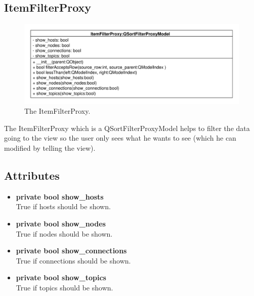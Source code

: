 \subsection{ItemFilterProxy}
\begin{figure}[htbp]
	\begin{minipage}[t]{7cm}
		\vspace{0pt}
		\centering
		\includegraphics[scale=0.6]{./diagram_pictures/ItemFilter.pdf}
		\caption{The ItemFilterProxy.}
	\end{minipage}
\end{figure} 
The ItemFilterProxy which is a QSortFilterProxyModel helps to filter the data going to the view so the user only sees what he wants to see (which he can modified by telling the view). 
\subsection{Attributes}
\begin{itemize}
  \item \textbf{private bool show\_hosts}\\
  True if hosts should be shown.
  \item \textbf{private bool show\_nodes}\\
  True if nodes should be shown.
  \item \textbf{private bool show\_connections}\\
  True if connections should be shown.
  \item \textbf{private bool show\_topics}\\
  True if topics should be shown.
\end{itemize}
